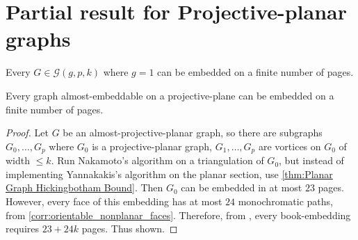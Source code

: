 
\section{Partial result for Projective-planar graphs}

\begin{theorem}
	Every $G \in \mathcal{G}(g, p, k)$ where $g = 1$ can be embedded on a finite number of pages.
\end{theorem}

\begin{theorem}
	Every graph almost-embeddable on a projective-plane can be embedded on a finite number of pages. 
\end{theorem}

\begin{proof}
	Let $G$ be an almost-projective-planar graph, so there are subgraphs $G_0, \ldots, G_p$ where $G_0$ is a projective-planar graph, $G_1, \ldots, G_p$ are vortices on $G_0$ of width $\leq k$. 
	Run Nakamoto's algorithm on a triangulation of $G_0$, but instead of implementing Yannakakis's algorithm on the planar section, use \cref{thm:Planar Graph Hickingbotham Bound}. Then $G_0$ can be embedded in at most $23$ pages. However, every face of this embedding has at most $24$ monochromatic paths, from \cref{corr:orientable_nonplanar_faces}. Therefore, from \label{lem:orientablesurfaces_monochromatic_edges}, every book-embedding requires $23 + 24k$ pages. Thus shown. 
\end{proof}